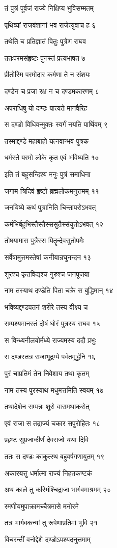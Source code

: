 तं पुत्रं पूर्वजं राज्ये निक्षिप्य भुविसम्मतम्

पृथिव्यां राजवंशानां भव राजेत्युवाच ह ६

तथेति च प्रतिज्ञातं पितुः पुत्रेण राघव

ततःपरमसंहृष्टः पुनस्तं प्रत्यभाषत ७

प्रीतोस्मि परमोदार कर्मणा ते न संशयः

दण्डेन च प्रजा रक्ष न च दण्डमकारणम् ८

अपराधिषु यो दण्डः पात्यते मानवैरिह

स दण्डो विधिवन्मुक्तः स्वर्गं नयति पार्थिवम् ९

तस्माद्दण्डे महाबाहो यत्नवान्भव पुत्रक

धर्मस्ते परमो लोके कृत एवं भविष्यति १०

इति तं बहुसन्दिश्य मनुः पुत्रं समाधिना

जगाम त्रिदिवं हृष्टो ब्रह्मलोकमनुत्तमम् ११

जनयिष्ये कथं पुत्रानिति चिन्तापरोऽभवत्

कर्मभिर्बहुभिस्तैस्तैस्ससुतैस्संयुतोऽभवत् १२

तोषयामास पुत्रैस्स पितॄन्देवसुतोपमैः

सर्वेषामुत्तमस्तेषां कनीयान्रघुनन्दन १३

शूरश्च कृतविद्यश्च गुरुश्च जनपूजया

नाम तस्याथ दण्डेति पिता चक्रे स बुद्धिमान् १४

भविष्यद्दण्डपतनं शरीरे तस्य वीक्ष्य च

सम्पश्यमानस्तं दोषं घोरं पुत्रस्य राघव १५

स विन्ध्यनीलयोर्मध्ये राज्यमस्य ददौ प्रभुः

स दण्डस्तत्र राजाभूद्रम्ये पर्वतमूर्द्धनि १६

पुरं चाप्रतिमं तेन निवेशाय तथा कृतम्

नाम तस्य पुरस्याथ मधुमत्तमिति स्वयम् १७

तथादेशेन सम्पन्नः शूरो वासमथाकरोत्

एवं राजा स तद्राज्यं चकार सपुरोहितः १८

प्रहृष्ट सुप्रजाकीर्णं देवराजो यथा दिवि

ततः स दण्डः काकुत्स्थ बहुवर्षगणायुतम् १९

अकारयत्तु धर्मात्मा राज्यं निहतकण्टकं

अथ काले तु कस्मिंश्चिद्राजा भार्गवमाश्रमम् २०

रमणीयमुपाक्रामच्चैत्रमासे मनोरमे

तत्र भार्गवकन्यां तु रूपेणाप्रतिमां भुवि २१

विचरन्तीं वनोद्देशे दण्डोऽपश्यदनुत्तमाम्

